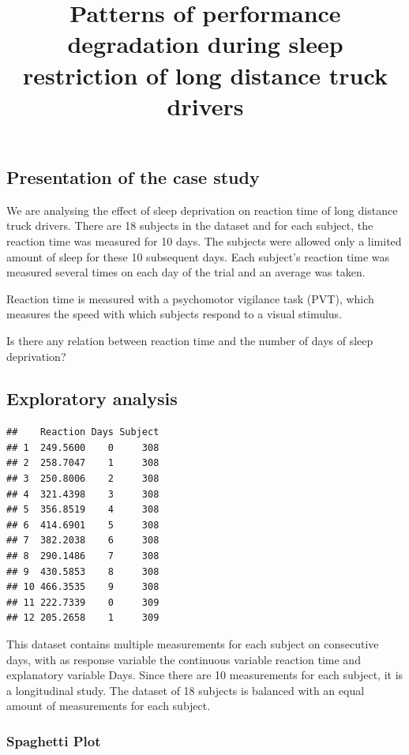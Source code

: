 \documentclass[
]{article}
\title{Patterns of performance degradation during sleep restriction of
long distance truck drivers}
\author{}
\date{}
\begin{document}
\maketitle

\hypertarget{presentation-of-the-case-study}{%
\subsection{Presentation of the case
study}\label{presentation-of-the-case-study}}

We are analysing the effect of sleep deprivation on reaction time of
long distance truck drivers. There are 18 subjects in the dataset and
for each subject, the reaction time was measured for 10 days. The
subjects were allowed only a limited amount of sleep for these 10
subsequent days. Each subject's reaction time was measured several times
on each day of the trial and an average was taken.

Reaction time is measured with a psychomotor vigilance task (PVT), which
measures the speed with which subjects respond to a visual stimulus.

Is there any relation between reaction time and the number of days of
sleep deprivation?

\hypertarget{exploratory-analysis}{%
\subsection{Exploratory analysis}\label{exploratory-analysis}}

\begin{verbatim}
##    Reaction Days Subject
## 1  249.5600    0     308
## 2  258.7047    1     308
## 3  250.8006    2     308
## 4  321.4398    3     308
## 5  356.8519    4     308
## 6  414.6901    5     308
## 7  382.2038    6     308
## 8  290.1486    7     308
## 9  430.5853    8     308
## 10 466.3535    9     308
## 11 222.7339    0     309
## 12 205.2658    1     309
\end{verbatim}

This dataset contains multiple measurements for each subject on
consecutive days, with as response variable the continuous variable
reaction time and explanatory variable Days. Since there are 10
measurements for each subject, it is a longitudinal study. The dataset
of 18 subjects is balanced with an equal amount of measurements for each
subject.

\hypertarget{spaghetti-plot}{%
\subsubsection{Spaghetti Plot}\label{spaghetti-plot}}
\end{document}
